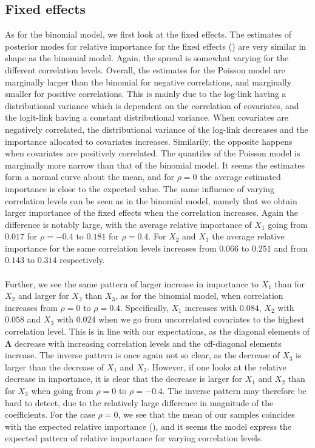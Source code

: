 \subsection{Fixed effects}
As for the binomial model, we first look at the fixed effects. The estimates of posterior modes for relative importance for the fixed effects () are very similar in shape as the binomial model. Again, the spread is somewhat varying for the different correlation levels. Overall, the estimates for the Poisson model are marginally larger than the binomial for negative correlations, and marginally smaller for positive correlations. This is mainly due to the log-link having a distributional variance which is dependent on the correlation of covariates, and the logit-link having a constant distributional variance. When covariates are negatively correlated, the distributional variance of the log-link decreases and the importance allocated to covariates increases. Similarily, the opposite happens when covariates are positively correlated. The quantiles of the Poisson model is marginally more narrow than that of the binomial model. It seems the estimates form a normal curve about the mean, and for $\rho=0$ the average estimated importance is close to the expected value. The same influence of varying correlation levels can be seen as in the binomial model, namely that we obtain larger importance of the fixed effects when the correlation increases. Again the difference is notably large, with the average relative importance of $X_1$ going from $0.017$ for $\rho=-0.4$ to $0.181$ for $\rho=0.4$. For $X_2$ and $X_3$ the average relative importance for the same correlation levels increases from $0.066$ to $0.251$ and from $0.143$ to $0.314$ respectively.
\\
\\
Further, we see the same pattern of larger increase in importance to $X_1$ than for $X_2$ and larger for $X_2$ than $X_3$, as for the binomial model, when correlation increases from $\rho=0$ to $\rho=0.4$. Specifically, $X_1$ increases with $0.084$, $X_2$ with $0.058$ and $X_3$ with $0.024$ when we go from uncorrelated covariates to the highest correlation level. This is in line with our expectations, as the diagonal elements of $\boldsymbol{\Lambda}$ decrease with increasing correlation levels and the off-diagonal elements increase. The inverse pattern is once again not so clear, as the decrease of $X_3$ is larger than the decrease of $X_1$ and $X_2$. However, if one looks at the relative decrease in importance, it is clear that the decrease is larger for $X_1$ and $X_2$ than for $X_3$ when going from $\rho=0$ to $\rho=-0.4$. The inverse pattern may therefore be hard to detect, due to the relatively large difference in magnitude of the coefficients. For the case $\rho=0$, we see that the mean of our samples coincides with the expected relative importance (), and it seems the model express the expected pattern of relative importance for varying correlation levels.
